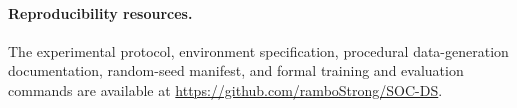 \paragraph{Reproducibility resources.}
The experimental protocol, environment specification, procedural
data-generation documentation, random-seed manifest, and formal training
and evaluation commands are available at
\url{https://github.com/ramboStrong/SOC-DS}.
